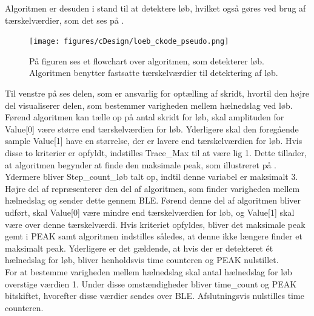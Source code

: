 Algoritmen er desuden i stand til at detektere løb, hvilket også gøres ved brug af tærskelværdier, som det ses på .
\begin{figure}[H]
	\centering
	\texttt{[image: figures/cDesign/loeb\_ckode\_pseudo.png]}
	\caption{På figuren ses et flowchart over algoritmen, som detekterer løb. Algoritmen benytter fastsatte tærskelværdier til detektering af løb.}
	\label{fig:loeb_pseudo}
\end{figure} \vspace{-0.5cm}
Til venstre på  ses delen, som er ansvarlig for optælling af skridt, hvortil den højre del visualiserer delen, som bestemmer varigheden mellem hælnedslag ved løb. Førend algoritmen kan tælle op på antal skridt for løb, skal amplituden for Value[0] være større end tærskelværdien for løb. Yderligere skal den foregående sample Value[1] have en størrelse, der er lavere end tærskelværdien for løb. Hvis disse to kriterier er opfyldt, indstilles Trace\_Max til at være lig 1. Dette tillader, at algoritmen begynder at finde den maksimale peak, som illustreret på . Ydermere bliver Step\_count\_løb talt op, indtil denne variabel er maksimalt 3. \\
Højre del af  repræsenterer den del af algoritmen, som finder varigheden mellem hælnedslag og sender dette gennem BLE. Førend denne del af algoritmen bliver udført, skal Value[0] være mindre end tærskelværdien for løb, og Value[1] skal være over denne tærskelværdi. Hvis kriteriet opfyldes, bliver det maksimale peak gemt i PEAK samt algoritmen indstilles således, at denne ikke længere finder et maksimalt peak. Yderligere er det gældende, at hvis der er detekteret ét hælnedslag for løb, bliver henholdsvis time counteren og PEAK nulstillet. \\
For at bestemme varigheden mellem hælnedslag  skal antal hælnedslag for løb overstige værdien 1. Under disse omstændigheder bliver time\_count og PEAK bitskiftet, hvorefter disse værdier sendes over BLE. Afslutningsvis nulstilles time counteren.

